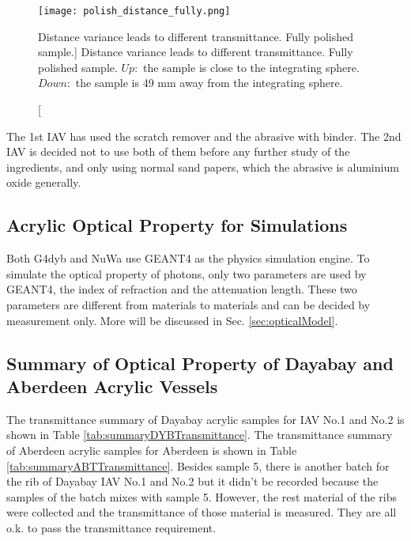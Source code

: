 \begin{figure}
    \label{fig:fig:polish_distance_fully}
    \centering
    \texttt{[image: polish\_distance\_fully.png]}
    \caption
    [Distance variance leads to different transmittance. Fully polished sample.]
    {Distance variance leads to different transmittance. Fully polished sample.
$Up:$ the sample is close to the integrating sphere.
$Down:$ the sample is 49 mm away from the integrating sphere.
}
    \end{figure}




The 1st IAV has used the scratch remover and the abrasive with binder. The 2nd
IAV is decided not to use both of them before any further study of the ingredients,
and only using normal sand papers, which the abrasive is aluminium oxide generally. 


\subsection {Acrylic Optical Property for Simulations}

Both G4dyb and NuWa use GEANT4 as the physics simulation engine.
To simulate the optical property of photons, only two parameters are used
by GEANT4, the index of refraction and the attenuation length. These two
parameters are different from materials to materials and can be decided
by measurement only.
More will be discussed in Sec. \ref{sec:opticalModel}.

\subsection {Summary of Optical Property of Dayabay and Aberdeen Acrylic Vessels}

The transmittance summary of Dayabay acrylic samples for IAV No.1 and No.2 is shown in Table \ref{tab:summaryDYBTransmittance}.
The transmittance summary of Aberdeen acrylic samples for Aberdeen is shown in Table \ref{tab:summaryABTTransmittance}.
Besides sample 5, there is another batch for the rib of Dayabay IAV No.1 and No.2 but it didn't
be recorded because the samples of the batch mixes with sample 5. However, the rest material
of the ribs were collected and the transmittance of those material is measured. They are all o.k.
to pass the transmittance requirement.

